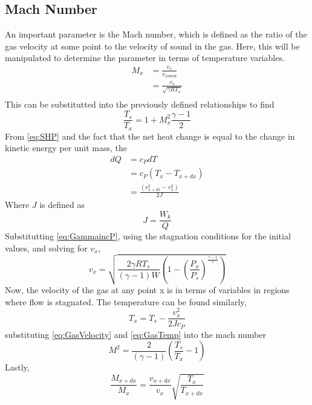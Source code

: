 \subsection{Mach Number}
An important parameter is the Mach number, which is defined as the ratio of the gas velocity at some point to the velocity of sound in the gas. Here, this will be manipulated to determine the parameter in terms of temperature variables.
\begin{align}\label{eq:DefineMach}
M_x&=\frac{v_x}{v_{sound}}\\
&=\frac{v_x}{\sqrt{\gamma R T_x}}\\
\end{align}%
This can be substitutted into the previously defined relationships to find
\begin{equation}\label{eq:1.25}
\frac{T_s}{T_x}=1+M_x^2\frac{\gamma-1}{2}
\end{equation}
From \ref{eq:SHP} and the fact that the net heat change is equal to the change in kinetic energy per unit mass, the
\begin{align}
dQ&=c_PdT\\
&=c_P(T_x-T_{x+dx})\\
&=\frac{(v_{x+dx}^2-v_x^2)}{2J}
\end{align}
Where $J$ is defined as
\begin{equation}
J=\frac{W_k}{Q}
\end{equation}%
Substitutting \ref{eq:GammaincP}, using the stagnation conditions for the initial values, and solving for $v_x$,
\begin{equation}\label{eq:GasVelocity}
v_x=\sqrt{\frac{2\gamma RT_s}{(\gamma-1)W}\left(1-\left(\frac{P_x}{P_s}\right)^{\frac{\gamma-1}{\gamma}}\right)}
\end{equation}
Now, the velocity of the gas at any point x is in terms of variables in regions where flow is stagnated. The temperature can be found similarly,
\begin{equation}\label{eq:GasTemp}
T_x=T_s-\frac{v_x^2}{2Jc_P}
\end{equation}
substituting \ref{eq:GasVelocity} and \ref{eq:GasTemp} into the mach number
\begin{equation}\label{eq:MachInTermsofT}
M^2=\frac{2}{(\gamma-1)}\left(\frac{T_s}{T_x}-1\right)
\end{equation}
Lastly,
\begin{equation}\label{eq:MRatio}
\frac{M_{x+dx}}{M_x}=\frac{v_{x+dx}}{v_x}\sqrt{\frac{T_x}{T_{x+dx}}}
\end{equation}
